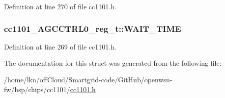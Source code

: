 Definition at line 270 of file cc1101.\+h.

\subsubsection[{\texorpdfstring{W\+A\+I\+T\+\_\+\+T\+I\+ME}{WAIT_TIME}}]{ cc1101\+\_\+\+A\+G\+C\+C\+T\+R\+L0\+\_\+reg\+\_\+t\+::\+W\+A\+I\+T\+\_\+\+T\+I\+ME}\hypertarget{structcc1101___a_g_c_c_t_r_l0__reg__t_a3b515e35e19a9a171be5c3f4038beccb}{}\label{structcc1101___a_g_c_c_t_r_l0__reg__t_a3b515e35e19a9a171be5c3f4038beccb}


Definition at line 269 of file cc1101.\+h.



The documentation for this struct was generated from the following file\+:\begin{DoxyCompactItemize}
\item 
/home/lkn/off\+Cloud/\+Smartgrid-\/code/\+Git\+Hub/openwsn-\/fw/bsp/chips/cc1101/\hyperlink{cc1101_8h}{cc1101.\+h}\end{DoxyCompactItemize}
